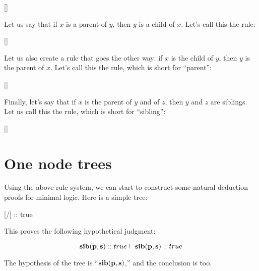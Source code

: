 \documentclass[../../../main.tex]{subfiles}
\begin{document}
\begin{prooftree*}
  []{}
\end{prooftree*}

\noindent
Let us say that if $x$ is a parent of $y$, then $y$ is a child of $x$. Let's call this the  rule:

\begin{prooftree*}
  []{}
\end{prooftree*}

\noindent
Let us also create a rule that goes the other way: if $x$ is the child of $y$, then $y$ is the parent of $x$. Let's call this the  rule, which is short for ``parent'':

\begin{prooftree*}
  []{}
\end{prooftree*}

\noindent
Finally, let's say that if $x$ is the parent of $y$ and of $z$, then $y$ and $z$ are siblings. Let us call this the  rule, which is short for ``sibling'':

\begin{prooftree*}
  []{}
\end{prooftree*}


\section{One node trees}

Using the above rule system, we can start to construct some natural deduction proofs for minimal logic. Here is a simple tree:

\begin{prooftree*}
  \hypo{}
  [\startrule/]{ :: true}
\end{prooftree*}

\noindent
This proves the following hypothetical judgment:

\begin{equation*}
  \nd{sib(p, s)} :: true \ndturnstile/ \nd{sib(p, s)} :: true
\end{equation*}

\noindent
The hypothesis of the tree is ``$\mathbf{sib(p, s)}$,'' and the conclusion is too.
\end{document}
